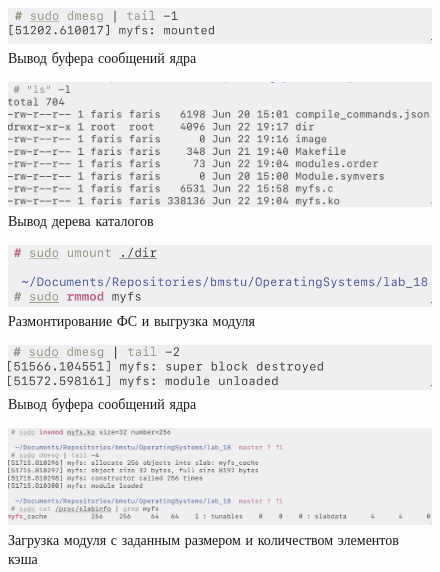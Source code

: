 \begin{figure}[H]
    \centering
    \caption{Вывод буфера сообщений ядра}\label{img:scr6}
    \includegraphics[scale=0.3]{images/scr6.png}
\end{figure}

\begin{figure}[H]
    \centering
    \caption{Вывод дерева каталогов}\label{img:scr7}
    \includegraphics[scale=0.3]{images/scr7.png}
\end{figure}

\begin{figure}[H]
    \centering
    \caption{Размонтирование ФС и выгрузка модуля}\label{img:scr8}
    \includegraphics[scale=0.3]{images/scr8.png}
\end{figure}

\begin{figure}[H]
    \centering
    \caption{Вывод буфера сообщений ядра}\label{img:scr9}
    \includegraphics[scale=0.3]{images/scr9.png}
\end{figure}

\begin{figure}[H]
    \centering
    \caption{Загрузка модуля с заданным размером и количеством элементов кэша}\label{img:scr10}
    \includegraphics[scale=0.3]{images/scr10.png}
\end{figure}
